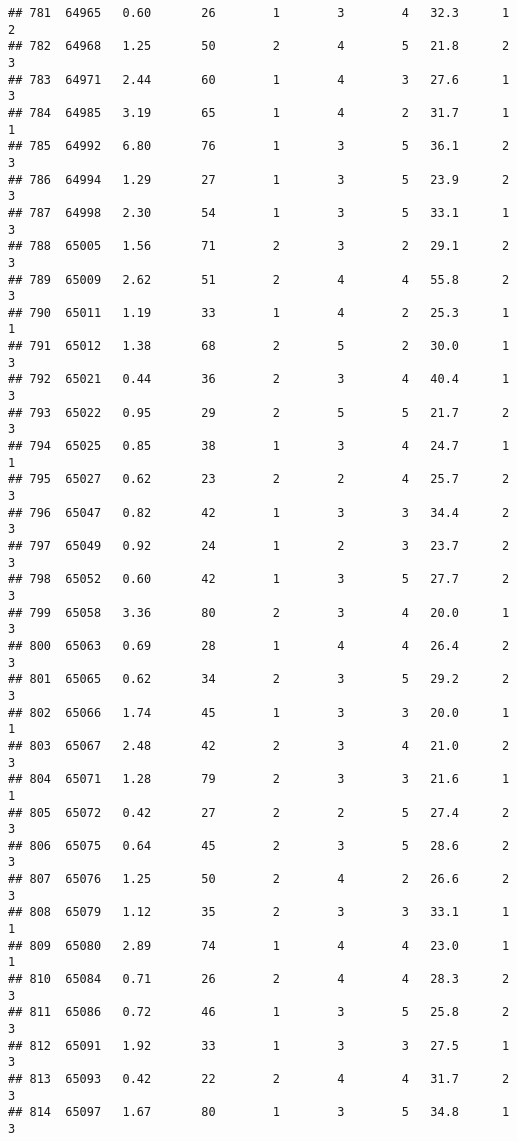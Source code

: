 \documentclass[
]{article}
\begin{document}
\begin{verbatim}
## 781  64965   0.60       26        1        3        4   32.3      1      2
## 782  64968   1.25       50        2        4        5   21.8      2      3
## 783  64971   2.44       60        1        4        3   27.6      1      3
## 784  64985   3.19       65        1        4        2   31.7      1      1
## 785  64992   6.80       76        1        3        5   36.1      2      3
## 786  64994   1.29       27        1        3        5   23.9      2      3
## 787  64998   2.30       54        1        3        5   33.1      1      3
## 788  65005   1.56       71        2        3        2   29.1      2      3
## 789  65009   2.62       51        2        4        4   55.8      2      3
## 790  65011   1.19       33        1        4        2   25.3      1      1
## 791  65012   1.38       68        2        5        2   30.0      1      3
## 792  65021   0.44       36        2        3        4   40.4      1      3
## 793  65022   0.95       29        2        5        5   21.7      2      3
## 794  65025   0.85       38        1        3        4   24.7      1      1
## 795  65027   0.62       23        2        2        4   25.7      2      3
## 796  65047   0.82       42        1        3        3   34.4      2      3
## 797  65049   0.92       24        1        2        3   23.7      2      3
## 798  65052   0.60       42        1        3        5   27.7      2      3
## 799  65058   3.36       80        2        3        4   20.0      1      3
## 800  65063   0.69       28        1        4        4   26.4      2      3
## 801  65065   0.62       34        2        3        5   29.2      2      3
## 802  65066   1.74       45        1        3        3   20.0      1      1
## 803  65067   2.48       42        2        3        4   21.0      2      3
## 804  65071   1.28       79        2        3        3   21.6      1      1
## 805  65072   0.42       27        2        2        5   27.4      2      3
## 806  65075   0.64       45        2        3        5   28.6      2      3
## 807  65076   1.25       50        2        4        2   26.6      2      3
## 808  65079   1.12       35        2        3        3   33.1      1      1
## 809  65080   2.89       74        1        4        4   23.0      1      1
## 810  65084   0.71       26        2        4        4   28.3      2      3
## 811  65086   0.72       46        1        3        5   25.8      2      3
## 812  65091   1.92       33        1        3        3   27.5      1      3
## 813  65093   0.42       22        2        4        4   31.7      2      3
## 814  65097   1.67       80        1        3        5   34.8      1      3

\end{verbatim}
\end{document}
